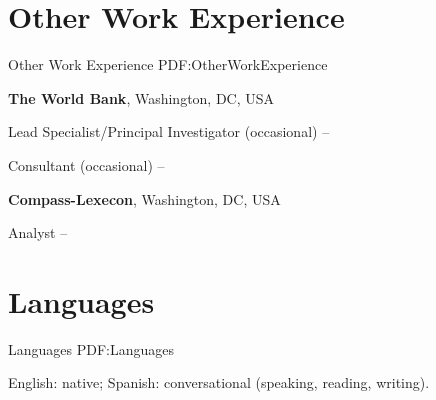 \documentclass[letterpaper,10pt,oneside]{article}
\begin{document}
\begin{body}

\section
{Other Work\newline
Experience}
{Other Work Experience}
{PDF:OtherWorkExperience}


\textbf{The World Bank},
Washington, DC, USA
\par
Lead Specialist/Principal Investigator (occasional)
\hfill
{} -- 

\smallskip


\par
Consultant (occasional)
\hfill
{} -- 

\smallskip

\textbf{Compass-Lexecon},
Washington, DC, USA
\par
Analyst
\hfill
{} --



\section
{Languages}
{Languages}
{PDF:Languages}

English: native; Spanish: conversational (speaking, reading, writing).

%

\end{body}

\label{LastPage}~
\end{document}
